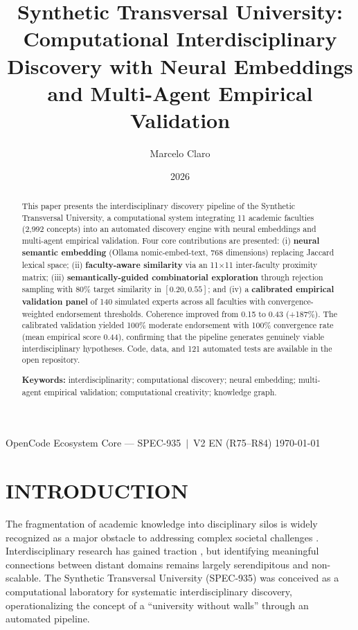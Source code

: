 \documentclass[a4paper,12pt]{article}
\title{Synthetic Transversal University: Computational Interdisciplinary Discovery \newline with Neural Embeddings and Multi-Agent Empirical Validation}
\author{Marcelo Claro}
\date{2026}
\begin{document}
\maketitle
\vspace{0.5cm}
{\small OpenCode Ecosystem Core --- SPEC-935~$\mid$~V2 EN (R75--R84)}
\vspace{0.3cm}
{\small \today}

\begin{abstract}
This paper presents the interdisciplinary discovery pipeline of the Synthetic Transversal 
University, a computational system integrating 11 academic faculties (2,992 concepts) into an 
automated discovery engine with neural embeddings and multi-agent empirical validation. 
Four core contributions are presented: (i) \textbf{neural semantic embedding} (Ollama 
nomic-embed-text, 768 dimensions) replacing Jaccard lexical space; (ii) \textbf{faculty-aware 
similarity} via an 11$\times$11 inter-faculty proximity matrix; (iii) \textbf{semantically-guided 
combinatorial exploration} through rejection sampling with 80\% target similarity in 
$[0.20, 0.55]$; and (iv) a \textbf{calibrated empirical validation panel} of 140 simulated 
experts across all faculties with convergence-weighted endorsement thresholds. 
Coherence improved from 0.15 to 0.43 (+187\%). The calibrated validation yielded 
100\% moderate endorsement with 100\% convergence rate (mean empirical score 0.44), 
confirming that the pipeline generates genuinely viable interdisciplinary hypotheses. 
Code, data, and 121 automated tests are available in the open repository.

\textbf{Keywords:} interdisciplinarity; computational discovery; neural embedding; 
multi-agent empirical validation; computational creativity; knowledge graph.
\end{abstract}


\section{INTRODUCTION}

The fragmentation of academic knowledge into disciplinary silos is widely recognized as 
a major obstacle to addressing complex societal challenges \cite{morin2000, nicolescu1996, 
klein2010}. Interdisciplinary research has gained traction \cite{frodeman2017, bammer2013}, 
but identifying meaningful connections between distant domains remains largely serendipitous 
and non-scalable. The Synthetic Transversal University (SPEC-935) was conceived as a 
computational laboratory for systematic interdisciplinary discovery, operationalizing the 
concept of a ``university without walls'' \cite{barnett2011} through an automated pipeline.
\end{document}
